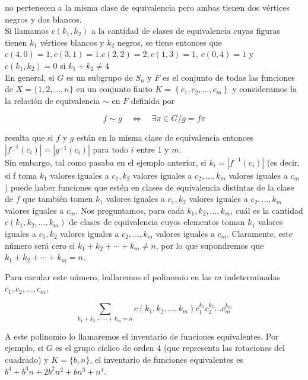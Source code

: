 \documentclass[10pt]{article}
\begin{document}
no pertenecen a la misma clase de equivalencia pero ambas tienen dos vértices negros y dos blancos.\\
Si llamamos $c\left(k_{1}, k_{2}\right)$ a la cantidad de clases de equivalencia cuyas figuras tienen $k_{1}$ vértices blancos y $k_{2}$ negros, se tiene entonces que $c(4,0)=1, c(3,1)=1 . c(2,2)=2, c(1,3)=1$, $c(0,4)=1$ y $c\left(k_{1}, k_{2}\right)=0$ si $k_{1}+k_{2} \neq 4$\\
En general, si $G$ es un subgrupo de $S_{n}$ y $F$ es el conjunto de todas las funciones de $X=\{1,2, \ldots, n\}$ en un conjunto finito $K=\left\{c_{1}, c_{2}, \ldots, c_{m}\right\}$ y consideramos la la relación de equivalencia $\sim$ en $F$ definida por

$$
f \sim g \quad \Longleftrightarrow \quad \exists \pi \in G / g=f \pi
$$

resulta que si $f$ y $g$ están en la misma clase de equivalencia entonces $\left|f^{-1}\left(c_{i}\right)\right|=\left|g^{-1}\left(c_{i}\right)\right|$ para todo $i$ entre 1 y $m$.\\
Sin embargo, tal como pasaba en el ejemplo anterior, si $k_{i}=\left|f^{-1}\left(c_{i}\right)\right|$ (es decir, si f toma $k_{1}$ valores iguales a $c_{1}, k_{2}$ valores iguales a $c_{2}, \ldots, k_{m}$ valores iguales a $c_{m}$ ) puede haber funciones que estén en clases de equivalencia distintas de la clase de $f$ que también tomen $k_{1}$ valores iguales a $c_{1}, k_{2}$ valores iguales a $c_{2}, \ldots, k_{m}$ valores iguales a $c_{m}$. Nos preguntamos, para cada $k_{1}, k_{2}, \ldots, k_{m}$, cuál es la cantidad $c\left(k_{1}, k_{2}, \ldots, k_{m}\right)$ de clases de equivalencia cuyos elementos toman $k_{1}$ valores iguales a $c_{1}, k_{2}$ valores iguales a $c_{2}, \ldots, k_{m}$ valores iguales a $c_{m}$. Claramente, este número será cero si $k_{1}+k_{2}+\cdots+k_{m} \neq n$, por lo que supondremos que $k_{1}+k_{2}+\cdots+k_{m}=n$.

Para cacular este número, hallaremos el polinomio en las $m$ indeterminadas $c_{1}, c_{2}, \ldots, c_{m}$,

$$
\sum_{k_{1}+k_{2}+\cdots+k_{m}=n} c\left(k_{1}, k_{2}, \ldots, k_{m}\right) c_{1}^{k_{1}} c_{2}^{k_{2}} \ldots c_{m}^{k_{m}}
$$

A este polinomio lo llamaremos el inventario de funciones equivalentes. Por ejemplo, si $G$ es el grupo cíclico de orden 4 (que representa las rotaciones del cuadrado) y $K=\{b, n\}$, el inventario de funciones equivalentes es $b^{4}+b^{3} n+2 b^{2} n^{2}+b n^{3}+n^{4}$.
\end{document}
